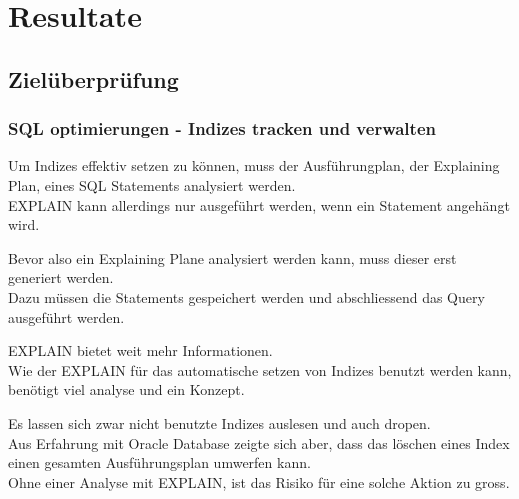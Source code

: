 
\clearpage
{}
\recalctypearea
\chapter{Resultate}
\section{Zielüberprüfung}

\clearpage
{}
\recalctypearea
\begin{flushleft}
    \subsection{SQL optimierungen - Indizes tracken und verwalten}
    Um Indizes effektiv setzen zu können, muss der Ausführungplan, der Explaining Plan, eines SQL Statements analysiert werden.\\
    EXPLAIN kann allerdings nur ausgeführt werden, wenn ein Statement angehängt wird\cite{A4Y646W7}.\\
\end{flushleft}
\begin{flushleft}
    Bevor also ein Explaining Plane analysiert werden kann, muss dieser erst generiert werden.\\
    Dazu müssen die Statements gespeichert werden und abschliessend das Query ausgeführt werden.
\end{flushleft}
\begin{flushleft}
    EXPLAIN bietet weit mehr Informationen.\\
    Wie der EXPLAIN für das automatische setzen von Indizes benutzt werden kann,\\
    benötigt viel analyse und ein Konzept.
\end{flushleft}
\begin{flushleft}
    Es lassen sich zwar nicht benutzte Indizes auslesen und auch dropen.\\
    Aus Erfahrung mit \Gls{Oracle Database} zeigte sich aber, dass das löschen eines Index einen gesamten Ausführungsplan umwerfen kann.\\
    Ohne einer Analyse mit EXPLAIN, ist das Risiko für eine solche Aktion zu gross.
\end{flushleft}
